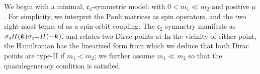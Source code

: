 \documentclass[aps, prb, showpacs, twocolumn, notitlepage, superscriptaddress]{revtex4-1}
\begin{document}

We begin with a minimal, $\mathfrak{c}_2$-symmetric model:
with $0{<}m_1{\ll}m_2$ and positive $\mu$. For simplicity, we interpret the Pauli matrices as  spin operators, and the two right-most terms of   as a spin-orbit coupling. The $\mathfrak{c}_2$ symmetry manifests as $\sigma_{\scriptscriptstyle{3}} H(\boldsymbol{k})\sigma_{\scriptscriptstyle{3}}{=}H({-}\boldsymbol{k})$, and relates 
two Dirac points at
In the vicinity of either point, the  Hamiltonian has the linearized form 
from which we deduce that both Dirac points are  type-II if $m_1{<}m_2$; we further assume $m_1{\ll}m_2$ so that the quasidegeneracy condition is satisfied. 



\end{document}

